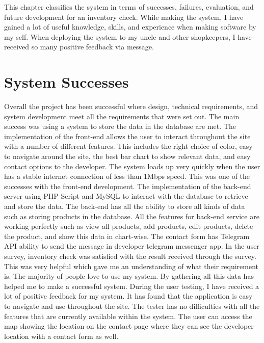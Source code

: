 This chapter classifies the system in terms of successes, failures, evaluation, and future development for an inventory check. While making the system, I have gained a lot of useful knowledge, skills, and experience when making software by my self. When deploying the system to my uncle and other shopkeepers, I have received so many positive feedback via message.  

\section{System Successes}
Overall the project has been successful where design, technical requirements, and system development meet all the requirements that were set out. The main success was using a system to store the data in the database are met.\newline 
\newline The implementation of the front-end allows the user to interact throughout the site with a number of different features. This includes the right choice of color, easy to navigate around the site, the best bar chart to show relevant data, and easy contact options to the developer. The system loads up very quickly when the user has a stable internet connection of less than 1Mbps speed. This was one of the successes with the front-end development.\newline
\newline The implementation of the back-end server using PHP Script and MySQL to interact with the database to retrieve and store the data. The back-end has all the ability to store all kinds of data such as storing products in the database. All the features for back-end service are working perfectly such as view all products, add products, edit products, delete the product, and show this data in chart-wise. The contact form has Telegram API ability to send the message in developer telegram messenger app.\newline
\newline In the user survey, inventory check was satisfied with the result received through the survey. This was very helpful which gave me an understanding of what their requirement is. The majority of people love to use my system. By gathering all this data has helped me to make a successful system.\newline
\newline During the user testing, I have received a lot of positive feedback for my system. It has found that the application is easy to navigate and use throughout the site. The tester has no difficulties with all the features that are currently available within the system. The user can access the map showing the location on the contact page where they can see the developer location with a contact form as well.

